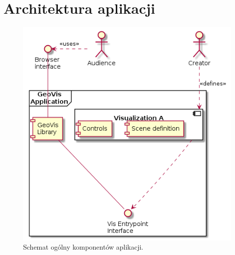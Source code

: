 \chapter{Architektura aplikacji}


\begin{figure}
    \centering
    \includegraphics[width=0.5\linewidth]{diagrams/out/helicopter_view}
    \caption{Schemat ogólny komponentów aplikacji.}
    \label{uml:helicopter}
\end{figure}


